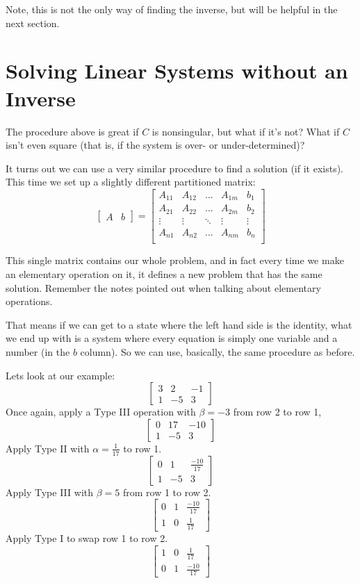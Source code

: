 Note, this is not the only way of finding the inverse, but will be helpful in the next section. 

\section{Solving Linear Systems without an Inverse}
The procedure above is great if $C$ is nonsingular, but what if it's not?
What if $C$ isn't even square (that is, if the system is over- or under-determined)?

It turns out we can use a very similar procedure to find a solution (if it exists). 
This time we set up a slightly different partitioned matrix: 
\[
\left[\begin{array}{c|c}A&b\end{array}\right] = 
\left[\begin{array}{cccc|c}
A_{11} & A_{12} & \hdots & A_{1m} & b_1\\
A_{21} & A_{22} & \hdots & A_{2m} & b_2\\
\vdots & \vdots & \ddots & \vdots &\vdots  \\
A_{n1} & A_{n2} & \hdots & A_{nm} & b_n\\
\end{array}\right]
\]

This single matrix contains our whole problem, 
and in fact every time we make an elementary operation on it, 
it defines a new problem that has the same solution. 
Remember the notes pointed out when talking about elementary operations. 

That means if we can get to a state where the left hand side is the identity,
what we end up with is a system where every equation is simply one variable and a number (in the $b$ column). 
So we can use, basically, the same procedure as before. 

Lets look at our example:
\[\left[\begin{array}{cc|c} 3 & 2 & -1\\ 1 & -5 & 3\end{array}\right]\]
Once again, apply a Type III operation with $\beta=-3$ from row 2 to row 1,
\[\left[\begin{array}{cc|c} 0 & 17 & -10\\ 1 & -5 & 3\end{array}\right]\]
Apply Type II with $\alpha=\frac{1}{17}$ to row 1. 
\[\left[\begin{array}{cc|c} 0 & 1 & \frac{-10}{17}\\ 1 & -5 & 3\end{array}\right]\]
Apply Type III with $\beta=5$ from row 1 to row 2.
\[\left[\begin{array}{cc|c} 0 & 1 & \frac{-10}{17}\\ 1 & 0 & \frac{1}{17}\end{array}\right]\]
Apply Type I to swap  row 1 to row 2.
\[\left[\begin{array}{cc|c} 1 & 0 & \frac{1}{17}\\0 & 1 & \frac{-10}{17}\end{array}\right]\]

